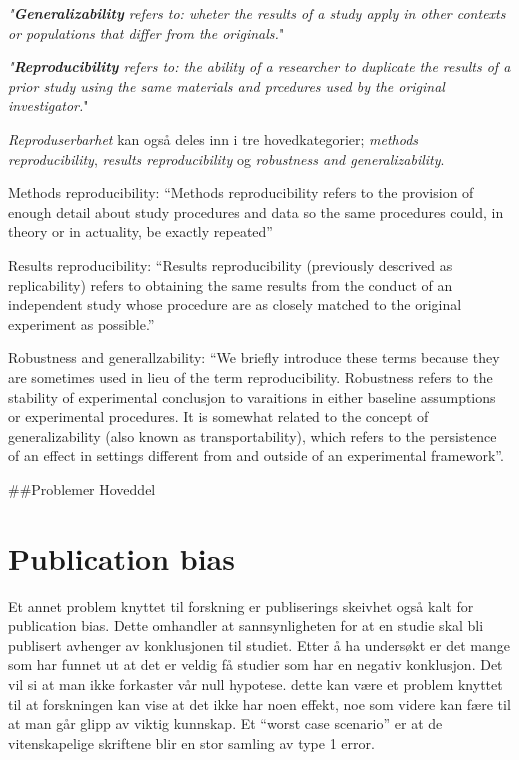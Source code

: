 \documentclass[
  12pt,
  norsk,
]{article}
\begin{document}
\emph{"\textbf{Generalizability} refers to: wheter the results of a
study apply in other contexts or populations that differ from the
originals.}"

\emph{"\textbf{Reproducibility} refers to: the ability of a researcher
to duplicate the results of a prior study using the same materials and
prcedures used by the original investigator.}"

\emph{\emph{Reproduserbarhet}} kan også deles inn i tre hovedkategorier;
\emph{methods reproducibility}, \emph{results reproducibility} og
\emph{robustness and generalizability}.

Methods reproducibility: ``Methods reproducibility refers to the
provision of enough detail about study procedures and data so the same
procedures could, in theory or in actuality, be exactly repeated''

Results reproducibility: ``Results reproducibility (previously descrived
as replicability) refers to obtaining the same results from the conduct
of an independent study whose procedure are as closely matched to the
original experiment as possible.''

Robustness and generallzability: ``We briefly introduce these terms
because they are sometimes used in lieu of the term reproducibility.
Robustness refers to the stability of experimental conclusjon to
varaitions in either baseline assumptions or experimental procedures. It
is somewhat related to the concept of generalizability (also known as
transportability), which refers to the persistence of an effect in
settings different from and outside of an experimental framework''.

\newpage

\#\#Problemer Hoveddel

\hypertarget{publication-bias}{%
\section{\texorpdfstring{\textbf{Publication
bias}}{Publication bias}}\label{publication-bias}}

Et annet problem knyttet til forskning er publiserings skeivhet også
kalt for publication bias. Dette omhandler at sannsynligheten for at en
studie skal bli publisert avhenger av konklusjonen til studiet. Etter å
ha undersøkt er det mange som har funnet ut at det er veldig få studier
som har en negativ konklusjon. Det vil si at man ikke forkaster vår null
hypotese. dette kan være et problem knyttet til at forskningen kan vise
at det ikke har noen effekt, noe som videre kan fære til at man går
glipp av viktig kunnskap. Et ``worst case scenario'' er at de
vitenskapelige skriftene blir en stor samling av type 1 error.
\end{document}
